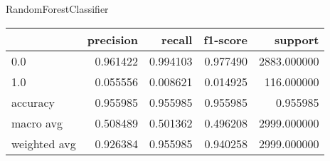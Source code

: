RandomForestClassifier
\begin{tabular}{lrrrr}
\toprule
{} &  precision &    recall &  f1-score &      support \\
\midrule
0.0          &   0.961422 &  0.994103 &  0.977490 &  2883.000000 \\
1.0          &   0.055556 &  0.008621 &  0.014925 &   116.000000 \\
accuracy     &   0.955985 &  0.955985 &  0.955985 &     0.955985 \\
macro avg    &   0.508489 &  0.501362 &  0.496208 &  2999.000000 \\
weighted avg &   0.926384 &  0.955985 &  0.940258 &  2999.000000 \\
\bottomrule
\end{tabular}
